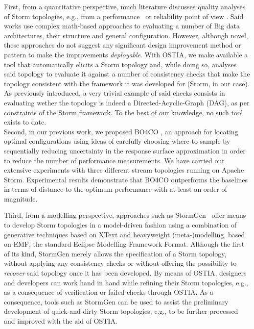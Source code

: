 First, from a quantitative perspective, much literature discusses quality analyses of Storm topologies, e.g., from a performance~\cite{perfbd} or reliability point of view \cite{bigdatareliab}. Said works use complex math-based approaches to evaluating a number of Big data architectures, their structure and general configuration. However, although novel, these approaches do not suggest any significant design improvement method or pattern to make the improvements \emph{deployable}. With OSTIA, we make available a tool that automatically elicits a Storm topology and, while doing so, analyses said topology to evaluate it against a number of consistency checks that make the topology consistent with the framework it was developed for (Storm, in our case). As previously introduced, a very trivial example of said checks consists in evaluating wether the topology is indeed a Directed-Acyclic-Graph (DAG), as per constraints of the Storm framework.  To the best of our knowledge, no such tool exists to date. \\
Second, in our previous work, we proposed {\small \sf BO4CO} \cite{jamshidi-vldb}, an approach for locating optimal configurations using ideas of carefully choosing where to sample by sequentially reducing uncertainty in the response surface approximation in order to reduce the number of performance measurements. We have carried out extensive experiments with three different stream topologies running on Apache Storm. Experimental results demonstrate that {\small \sf BO4CO} outperforms the baselines in terms of distance to the optimum performance with at least an order of magnitude. 

Third, from a modelling perspective, approaches such as StormGen~\cite{stormgen} offer means to develop Storm topologies in a model-driven fashion using a combination of generative techniques based on XText and heavyweight (meta-)modelling, based on EMF, the standard Eclipse Modelling Framework Format. Although the first of its kind, StormGen merely allows the specification of a Storm topology, without applying any consistency checks or without offering the possibility to \emph{recover} said topology once it has been developed. By means of OSTIA, designers and developers can work hand in hand while refining their Storm topologies, e.g., as a consequence of verification or failed checks through OSTIA. As a consequence, tools such as StormGen can be used to assist the preliminary development of quick-and-dirty Storm topologies, e.g., to be further processed and improved with the aid of OSTIA.

